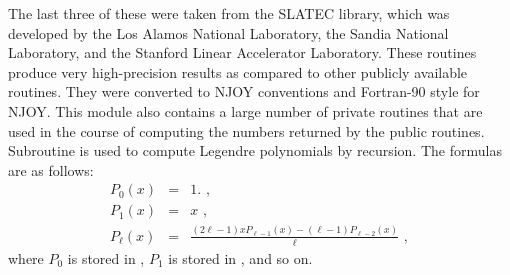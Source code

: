\noindent
The last three of these were taken from the SLATEC library, which
was developed by the Los Alamos National Laboratory, the Sandia
National Laboratory, and the Stanford Linear Accelerator Laboratory.
These routines produce very high-precision results as compared to
other publicly available routines.  They were converted to NJOY
conventions and Fortran-90 style for NJOY.  This module also
contains a large number of private routines that are used in the
course of computing the numbers returned by the public routines.
Subroutine  is used to compute Legendre
polynomials by recursion.  The formulas are as follows:
\begin{eqnarray}
   P_0(x) & = &  1.\,\,, \\
   P_1(x) & = &  x \,\,,\\
   P_{\ell}(x) & = & \frac{(2\ell-1)xP_{\ell-1}(x)
        - (\ell-1)P_{\ell-2}(x)}{\ell} \,\,,
\end{eqnarray}
where $P_0$ is stored in , $P_1$ is stored in
, and so on.

\cleardoublepage

